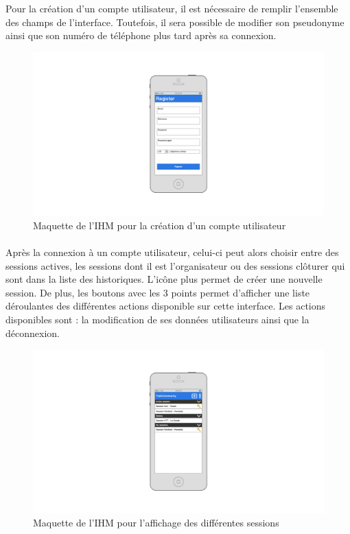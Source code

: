 \documentclass[titlepage, 12pt]{report}
\begin{document}
\par Pour la création d'un compte utilisateur, il est nécessaire de remplir l'ensemble des champs de l'interface. Toutefois, il sera possible de modifier son pseudonyme ainsi que son numéro de téléphone plus tard après sa connexion.

\begin{figure}[!h]
	\caption{Maquette de l'IHM pour la création d'un compte utilisateur}
	\label{create_user_account}
	\centering
	\includegraphics[scale=0.2]{images/mockups/register.png}
\end{figure}

\paragraph{}Après la connexion à un compte utilisateur, celui-ci peut alors choisir entre des sessions actives, les sessions dont il est l'organisateur ou des sessions clôturer qui sont dans la liste des historiques. L'icône plus permet de créer une nouvelle session. De plus, les boutons avec les 3 points permet d'afficher une liste déroulantes des différentes actions disponible sur cette interface. Les actions disponibles sont : la modification de ses données utilisateurs ainsi que la déconnexion.

\begin{figure}[!h]
	\caption{Maquette de l'IHM pour l'affichage des différentes sessions}
	\label{all_sessions}
	\centering
	\includegraphics[scale=0.2]{images/mockups/session_view.png}
\end{figure}
\end{document}
